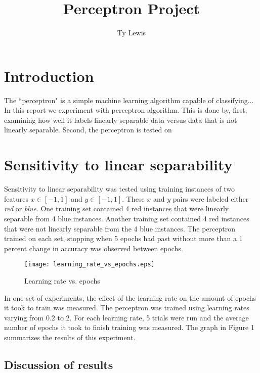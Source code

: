 \documentclass[12pt,letterpaper]{article}
\title{Perceptron Project}
\author{Ty Lewis}
\begin{document}
 
\maketitle
\vspace{-10pt}
\section*{Introduction}
The ``perceptron" is a simple machine learning algorithm capable of classifying... In this report we experiment with perceptron algorithm. This is done by, first, examining how well it labels linearly separable data versus data that is not linearly separable. Second, the perceptron is tested on 

\section*{Sensitivity to linear separability}

Sensitivity to linear separability was tested using training instances of two features $x \in [-1, 1]$ and $y \in [-1, 1]$. These $x$ and $y$ pairs were labeled either \emph{red} or \emph{blue}. One training set contained 4 red instances that were linearly separable from 4 blue instances. Another training set contained 4 red instances that were not linearly separable from the 4 blue instances. The perceptron trained on each set, stopping when 5 epochs had past without more than a 1 percent change in accuracy was observed between epochs.

\begin{wrapfigure}{r}{0.6\textwidth}
\vspace{-20pt}
\centering
\texttt{[image: learning\_rate\_vs\_epochs.eps]} 
\vspace{-10pt}
\caption{Learning rate vs. epochs}
\vspace{-20pt}
\end{wrapfigure}

In one set of experiments, the effect of the learning rate on the amount of epochs it took to train was measured. The perceptron was trained using learning rates varying from $0.2$ to $2$. For each learning rate, 5 trials were run and the average number of epochs it took to finish training was measured. The graph in Figure 1 summarizes the results of this experiment.

\subsection*{Discussion of results}
\end{document}
